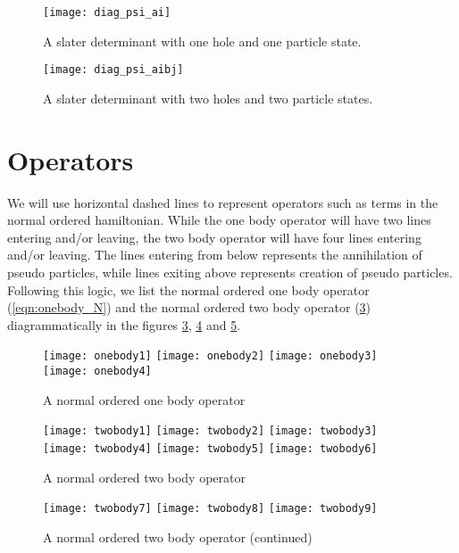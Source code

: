 \begin{figure}[p]
    \centering
    \texttt{[image: diag\_psi\_ai]}
    \caption{A slater determinant with one hole and one particle state.}
    \label{fig:diag_psi_ai}
\end{figure}

\begin{figure}[p]
    \centering
    \texttt{[image: diag\_psi\_aibj]}
    \caption{A slater determinant with two holes and two particle states.}
    \label{fig:diag_psi_aibj}
\end{figure}

\section{Operators}

We will use horizontal dashed lines to represent operators such as terms in the normal ordered hamiltonian. While the one body operator will have two lines entering and/or leaving, the two body operator will have four lines entering and/or leaving. The lines entering from below represents the annihilation of pseudo particles, while lines exiting above represents creation of pseudo particles. Following this logic, we list the normal ordered one body operator (\ref{eqn:onebody_N}) and the normal ordered two body operator (\ref{fig:onebody}) diagrammatically in the figures \ref{fig:onebody}, \ref{fig:twobody1} and \ref{fig:twobody2}.

\begin{figure}[p]
    \centering
    \texttt{[image: onebody1]}
    \texttt{[image: onebody2]}
    \texttt{[image: onebody3]}
    \texttt{[image: onebody4]}
    \caption{A normal ordered one body operator}
    \label{fig:onebody}
\end{figure}

\begin{figure}[p]
    \centering
    \texttt{[image: twobody1]}
    \texttt{[image: twobody2]}
    \texttt{[image: twobody3]}
    \texttt{[image: twobody4]}
    \texttt{[image: twobody5]}
    \texttt{[image: twobody6]}
    \caption{A normal ordered two body operator}
    \label{fig:twobody1}
\end{figure}

\begin{figure}[p]
    \centering
    \texttt{[image: twobody7]}
    \texttt{[image: twobody8]}
    \texttt{[image: twobody9]}
    \caption{A normal ordered two body operator (continued)}
    \label{fig:twobody2}
\end{figure}

